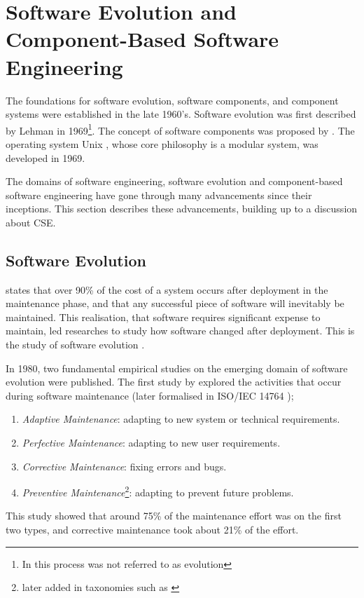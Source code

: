\section{Software Evolution and Component-Based Software Engineering}
\label{background.histories}
The foundations for software evolution, software components, and component systems were established in the late 1960's.
Software evolution was first described by Lehman in 1969\footnote{In \cite{Lehman1969} this process was not referred to as evolution}.
The concept of software components was proposed by \cite{McIlroy1969}.
The operating system Unix \citep{raymond2003art}, whose core philosophy is a modular system, was developed in 1969.

The domains of software engineering, software evolution and component-based software engineering have gone through many advancements since their inceptions.
This section describes these advancements, building up to a discussion about CSE.

\subsection{Software Evolution}
\cite{Brooks1975} states that over 90\% of the cost of a system occurs after deployment in the maintenance phase,
and that any successful piece of software will inevitably be maintained.
This realisation, that software requires significant expense to maintain, led researches to study how software changed after deployment.
This is the study of software evolution \citep{lehman1980}.

In 1980, two fundamental empirical studies on the emerging domain of software evolution were published.
The first study by \cite{Lientz1980} explored the activities that occur during software maintenance (later formalised in ISO/IEC 14764 \citep{IsoIec2006});
\begin{enumerate}
	\item \textit{Adaptive Maintenance}: adapting to new system or technical requirements.
	\item \textit{Perfective Maintenance}: adapting to new user requirements.
	\item \textit{Corrective Maintenance}: fixing errors and bugs.
	\item \textit{Preventive Maintenance}\footnote{later added in taxonomies such as \citep{iee1990ieee}}: adapting to prevent future problems.
\end{enumerate} 

This study showed that around 75\% of the maintenance effort was on the first two types, and corrective maintenance took about 21\% of the effort.

